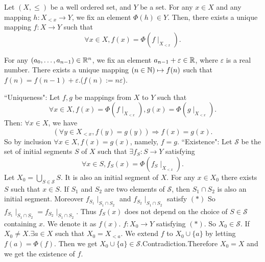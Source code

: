 \begin{theoremenv}
    Let $(X, \le)$ be a well ordered set,  and $Y$ be a set. For any $x\in X$ and any mapping $h:X_{<x}\rightarrow Y$,  we fix an element $\Phi(h)\in Y$. Then,  there exists a unique mapping $f:X\rightarrow Y$  such that 
    $$\forall x\in X,  f(x)=\Phi(f\mid_{X_{<x}}).$$
\end{theoremenv}
\begin{exampleenv}
    For any $(a_0, \dots, a_{n-1})\in \mathbb{R}^n$,  we fix an element $a_{n-1}+\varepsilon\in \mathbb{R}$,  where $\varepsilon$ is a real number. There exists a unique mapping $(n\in \mathbb{N})\mapsto f(n)$ such that $f(n)=f(n-1)+\varepsilon$.($f(n):=n\varepsilon$).
\end{exampleenv}
\begin{proofenv}
    \quad
    \newline
    ``Uniqueness": 
    \newline
    Let $f, g$ be mappings from $X$ to $Y$ such that 
    $$\forall x\in X, f(x)=\Phi(f\mid_{X_{<x}}), g(x)=\Phi(g\mid_{X_{<x}}).$$
    Then: $\forall x\in X$,  we have 
    $$(\forall y\in X_{<x}, f(y)=g(y))\Rightarrow f(x)=g(x).$$
    So by inclusion $\forall x \in X,  f(x)=g(x)$,  namely,  $f=g$.
    \newline
    ``Existence": 
    \newline
    Let $\mathscr{S}$  be the set of initial segments $S$ of $X$ such that $\exists f_S:S\rightarrow Y$ satisfying 
    \begin{equation*}
        \forall x\in S, f_S(x)=\Phi(f_S\mid_{X_{<x}}). \tag{$*$}
    \end{equation*}
    Let $X_0=\bigcup_{S\in\mathscr{S} }S$. It is also an initial segment of $X$. For any $x\in X_0$ there exists $ S $ such that $x\in S$. If $S_1$ and $S_2$ are two elements of $\mathscr{S}$,  then $S_1\cap S_2$ is also an initial segment. Moreover $f_{S_1}\mid_{S_1\cap S_2}$ and $f_{S_2}\mid_{S_1\cap S_2}$ satisfy $(*)$ So $f_{S_1}\mid_{S_1\cap S_2}=f_{S_2}\mid_{S_1\cap S_2}$. Thus $f_S(x)$ does not depend on the choice of $S\in \mathscr{S}$ containing $x$. We denote it as $f(x)$. $f:X_0\rightarrow Y$ satisfying $(*)$. So $X_0\in \mathscr{S}$.
    If $X_0\not=X.\exists a\in X$ such that $ X_0=X_{<a}$. We extend $f$ to $X_0\cup\{a\}$ by letting $f(a)=\Phi(f)$. Then we get $X_0\cup\{a\}\in \mathscr{S}$.Contradiction.Therefore $X_0=X$  and we get the existence of $f$. 
\end{proofenv}

